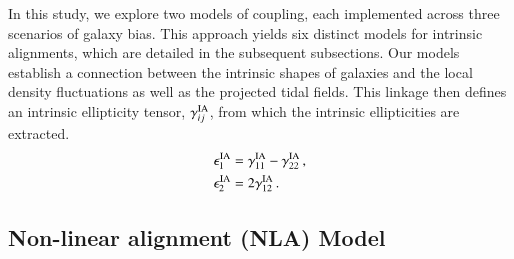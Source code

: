 In this study, we explore two models of coupling, each implemented across three scenarios of galaxy bias.
This approach yields six distinct models for intrinsic alignments, which are detailed in the subsequent subsections. 
Our models establish a connection between the intrinsic shapes of galaxies and the local density fluctuations as well as the projected tidal fields. 
This linkage then defines an intrinsic ellipticity tensor, $\gamma_{ij}^{\rm IA}$, from which the intrinsic ellipticities are extracted.
\begin{equation}
\begin{split}
\epsilon_{1}^{\rm IA} &= \gamma_{11}^{\rm IA} - \gamma_{22}^{\rm IA} \, , 
\\
\epsilon_{2}^{\rm IA} &= 2 \gamma_{12}^{\rm IA} \, .
\label{eq:tidal_th}
\end{split}
\end{equation}

 
\subsection{Non-linear alignment (NLA) Model}

